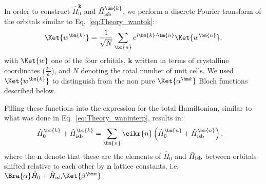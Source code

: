 In order to construct $\hat{H}_0^{\bm{k}}$ and $\hat{H}_{\rm isb}^{\bm{k}}$, we perform a discrete Fourier transform of the orbitals similar to Eq.~\eqref{eq:Theory_wantok}:
\begin{equation}
	\label{eq:Rashba_wantok}
	\Ket{w^{\bm{k}}} = \frac{1}{\sqrt{N}}\sum_{\bm{n}} e^{i \bm{k}\cdot \bm{n}}\Ket{w^{\bm{n}}},
\end{equation}
with $\Ket{w}$ one of the four orbitals, $\bm{k}$ written in terms of crystalline coordinates ($\frac{2\pi}{a}$), and $N$ denoting the total number of unit cells. We used $\Ket{w^{\bm{k}}}$ to distinguish from the non pure $\Ket{\alpha^{\bm k}}$ Bloch functions described below.

Filling these functions into the expression for the total Hamiltonian, similar to what was done in Eq.~\eqref{eq:Theory_waninterp}, results in:
\begin{align}
	\label{eq:Rashba_wantokH}
	\hat{H}_0^{\bm{k}} + \hat{H}_{\rm isb}^{\bm{k}} &= \sum_{\bm{n}} \eikr{n} \left(\hat{H}_0^{\bm{n}} + \hat{H}_{\rm isb}^{\bm{n}}\right),
\end{align}
where the $\bm n$ denote that these are the elements of $\hat{H}_0$ and $\hat{H}_{\rm isb}$ between orbitals shifted relative to each other by $\bm n$ lattice constants, i.e. $\Bra{\alpha} \hat H_0 + \hat H_{\rm isb} \Ket{\beta^{\bm n}}$
    
